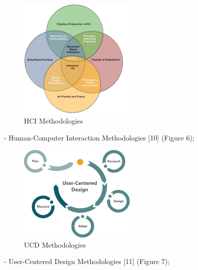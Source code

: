 \begin{figure}[!hbt]
\centering
\includegraphics[width=0.50\textwidth]{ven-diagram.png}
\caption{\label{fig:frog}HCI Methodologies}
\end{figure}

- Human-Computer Interaction Methodologies [10] (Figure 6);

\begin{figure}[!hbt]
\centering
\includegraphics[width=0.50\textwidth]{ucd_new.png}
\caption{\label{fig:frog}UCD Methodologies}
\end{figure}

- User-Centered Design Methodologies [11] (Figure 7);

\clearpage

